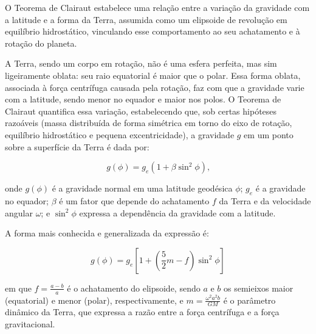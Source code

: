 O Teorema de Clairaut estabelece uma relação entre a variação da gravidade com a latitude e a forma da Terra, assumida como um elipsoide de revolução em equilíbrio hidrostático, vinculando esse comportamento ao seu achatamento e à rotação do planeta.

A Terra, sendo um corpo em rotação, não é uma esfera perfeita, mas sim ligeiramente oblata: seu raio equatorial é maior que o polar. Essa forma oblata, associada à força centrífuga causada pela rotação, faz com que a gravidade varie com a latitude, sendo menor no equador e maior nos polos. O Teorema de Clairaut quantifica essa variação, estabelecendo que, sob certas hipóteses razoáveis (massa distribuída de forma simétrica em torno do eixo de rotação, equilíbrio hidrostático e pequena excentricidade), a gravidade \( g \) em um ponto sobre a superfície da Terra é dada por:

\[
g(\phi) = g_e \left( 1 + \beta \sin^2 \phi \right) \text{,}
\]

\noindent
onde \( g(\phi) \) é a gravidade normal em uma latitude geodésica \( \phi \); \( g_e \) é a gravidade no equador; \( \beta \) é um fator que depende do achatamento \( f \) da Terra e da velocidade angular \( \omega \); e \( \sin^2 \phi \) expressa a dependência da gravidade com a latitude.

A forma mais conhecida e generalizada da expressão é:

\[
g(\phi) = g_e \left[ 1 + \left( \frac{5}{2}m - f \right)\sin^2 \phi \right]
\]

\noindent
em que \( f = \frac{a - b}{a} \) é o achatamento do elipsoide, sendo \( a \) e \( b \) os semieixos maior (equatorial) e menor (polar), respectivamente, e \( m = \frac{\omega^2 a^2 b}{GM} \) é o parâmetro dinâmico da Terra, que expressa a razão entre a força centrífuga e a força gravitacional.



